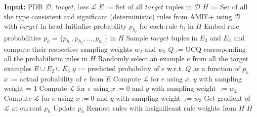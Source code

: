 \documentclass[akbc,twoside,11pt]{article}
\newcounter{example}
\newcommand{\algorithmname}{SafeLearner\xspace}
\begin{document}
\begin{algorithm}
\begin{small}
\caption{\algorithmname}\label{alg:main}
\begin{algorithmic}[1]
\STATE \textbf{Input:} PDB $\mathcal{D}$, $target$, loss $\mathcal{L}$
\STATE $E$ := Set of all $target$ tuples in $\mathcal{D}$
\STATE $H$ := Set of all the type consistent and significant (deterministic) rules from AMIE+ using $\mathcal{D}$ with $target$ in head \label{alg_line:amie}
\STATE Initialize probability $p_{h_i}$ for each rule $h_i$ in $H$ \label{alg_line:init1}
\STATE Embed rule probabilities $p_h = \{p_{h_1}, p_{h_2}, \ldots, p_{h_n}\}$ in $H$ \label{alg_line:init2}
\STATE Sample $target$ tuples in $E_2$ and $E_3$ and compute their respective sampling weights $w_2$ and $w_3$ \label{alg_line:samp}
\STATE $Q$ := UCQ corresponding all the probabilistic rules in $H$ \label{alg_line:Q}
 \label{alg_line:SGD1}
    \STATE Randomly select an example $e$ from all the target examples $E \cup E_2 \cup E_3$
    \STATE $y$ := predicted probability of $e$ w.r.t. $Q$ as a function of $p_h$
        \STATE $x$ := actual probability of $e$ from $E$
        \STATE Compute $\mathcal{L}$ for $e$ using $x$, $y$ with sampling weight = 1
        \STATE Compute $\mathcal{L}$ for $e$ using $x := 0$ and $y$ with sampling weight $:= w_2$
        \STATE Compute $\mathcal{L}$ for $e$ using $x := 0$ and $y$ with sampling weight $:= w_3$
    \ENDIF \STATE Get gradient of $\mathcal{L}$ at current $p_h$
    \STATE Update $p_h$
\ENDFOR \label{alg_line:SGD2}
\STATE Remove rules with insignificant rule weights from $H$ \label{alg_line:prune}
\STATE \Return $H$ 
\end{algorithmic}
\end{small}
\end{algorithm}
\end{document}
